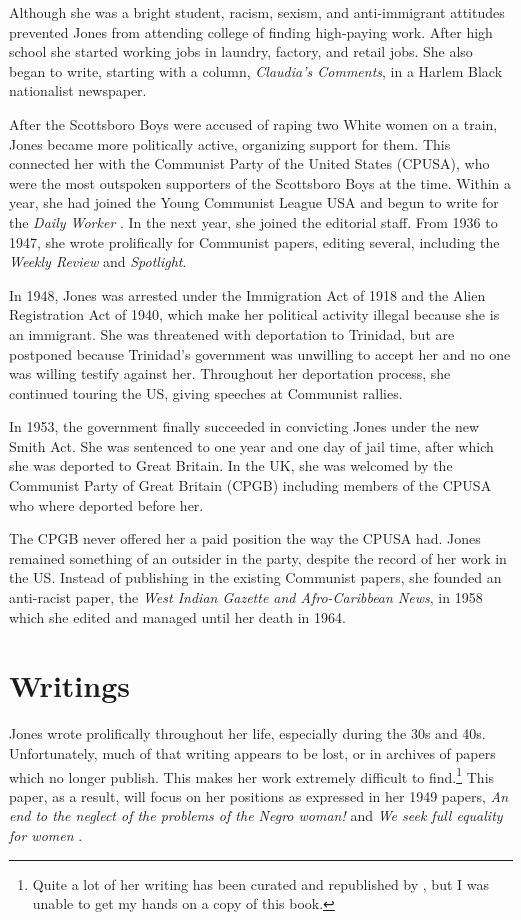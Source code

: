 \documentclass[man,12pt,natbib]{apa6}
\begin{document}
Although she was a bright student, racism, sexism, and anti-immigrant attitudes
prevented Jones from attending college of finding high-paying work. After high
school she started working jobs in laundry, factory, and retail jobs. She also
began to write, starting with a column, \emph{Claudia's Comments}, in a Harlem
Black nationalist newspaper.

After the Scottsboro Boys were accused of raping two White women on a train, 
Jones became more politically active, organizing support for them. This
connected her with the Communist Party of the United States (CPUSA), who were
the most outspoken supporters of the Scottsboro Boys at the time. Within a 
year, she had joined the Young Communist League USA and begun to write for the
\emph{Daily Worker} \citep{Davis15}. In the next year, she joined the editorial
staff. From 1936 to 1947, she wrote prolifically for Communist papers, editing
several, including the \emph{Weekly Review} and \emph{Spotlight}.

In 1948, Jones was arrested under the Immigration Act of 1918 and the Alien
Registration Act of 1940, which make her political activity illegal because
she is an immigrant. She was threatened with deportation to Trinidad, but 
are postponed because Trinidad's government was unwilling to accept her and
no one was willing testify against her. Throughout her deportation process, she
continued touring the US, giving speeches at Communist rallies.

In 1953, the government finally succeeded in convicting Jones under the new
Smith Act. She was sentenced to one year and one day of jail time, after which
she was deported to Great Britain. In the UK, she was welcomed by the Communist
Party of Great Britain (CPGB) including members of the CPUSA who where deported
before her.

The CPGB never offered her a paid position the way the CPUSA had. Jones
remained something of an outsider in the party, despite the record of her work
in the US. Instead of publishing in the existing Communist papers, she founded
an anti-racist paper, the \emph{West Indian Gazette and Afro-Caribbean News},
in 1958 which she edited and managed until her death in 1964.

\section{Writings}

Jones wrote prolifically throughout her life, especially during the 30s and
40s.  Unfortunately, much of that writing appears to be lost, or in archives of
papers which no longer publish. This makes her work extremely difficult to
find.\footnote{Quite a lot of her writing has been curated and republished by
	\citet{Davies11}, but I was unable to get my hands on a copy of this book.}
This paper, as a result, will focus on her positions as expressed in her 1949
papers, \emph{An end to the neglect of the problems of the Negro woman!}
\citep{Jones49a} and \emph{We seek full equality for women} \citep{Jones49b}.
\end{document}

